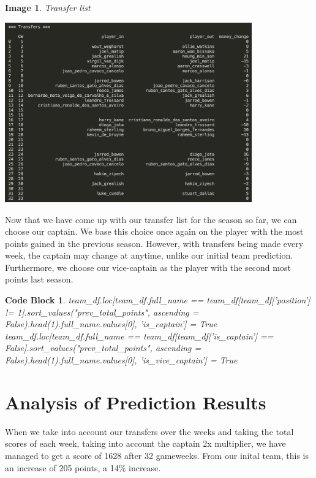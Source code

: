\documentclass[12pt, a4paper, oneside]{book}
\newtheorem{image}[theorem]{Image}
\newtheorem{codeblock}[theorem]{Code Block}
\numberwithin{equation}{section}
\begin{document}
\begin{image} \label{transfer list}
  Transfer list

  \vspace{0.5cm}

  \centerline{\includegraphics[width=0.8\textwidth]{images/prediction/weekly-transfers/transfer-list.png}}
\end{image}

\vspace{0.5cm}

Now that we have come up with our transfer list for the season so far, we can choose our captain. We base this choice once again on the player with the most points gained in the previous season. However, with transfers being made every week, the captain may change at anytime, unlike our initial team prediction. Furthermore, we choose our vice-captain as the player with the second most points last season.

\begin{codeblock}
  team\_df.loc[team\_df.full\_name == team\_df[team\_df['position'] != 1].sort\_values("prev\_total\_points", ascending = False).head(1).full\_name.values[0], 'is\_captain'] = True
    team\_df.loc[team\_df.full\_name == team\_df[team\_df['is\_captain'] == False].sort\_values("prev\_total\_points", ascending = False).head(1).full\_name.values[0], 'is\_vice\_captain'] = True
\end{codeblock}


\section{Analysis of Prediction Results}\label{sec:5.3}

When we take into account our transfers over the weeks and taking the total scores of each week, taking into account the captain 2x multiplier, we have managed to get a score of 1628 after 32 gameweeks. From our inital team, this is an increase of 205 points, a 14\% increase.
\end{document}
